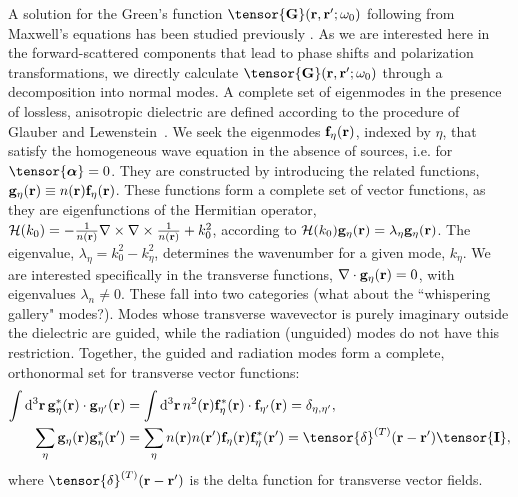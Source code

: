 \documentclass[preprint,aps,pra,onecolumn]{revtex4-1} %
\newcommand{\fidx}{\eta}
\newcommand{\unittens}{\tensor{\mathbf{I}}}
\newcommand{\eigenf}{\mbf{f}_\fidx}
\newcommand{\eigenfp}{\mbf{f}_{\fidx'}}
\newcommand{\eigeng}{\mbf{g}_\fidx}
\newcommand{\eigengp}{\mbf{g}_{\fidx'}}
\newcommand{\comment}[1]{{\color{Maroon} #1}}
\begin{document}
A solution for the Green's function $\tensor{\mathbf{G}}(\br ,\br' ; \omega_0)$ following from Maxwell's equations 
has been studied previously \cite{sakoda_optical_1996,sondergaard_general_2001,wubs_multiple-scattering_2004}.  As we are interested here in the forward-scattered components that lead to phase shifts and polarization transformations, we directly calculate $\tensor{\mathbf{G}}(\br ,\br' ; \omega_0)$ through a decomposition into normal modes.  A complete set of eigenmodes in the presence of lossless, anisotropic dielectric are defined according to the procedure of Glauber and Lewenstein~\cite{glauber_quantum_1991}.  We seek the eigenmodes $\eigenf(\mathbf{r})$, indexed by $\fidx$, that satisfy the homogeneous wave equation in the absence of sources, i.e.  for $\tensor{\boldsymbol{\alpha}} = 0$.  They are constructed by introducing the related functions, $\eigeng(\mbf{r}) \equiv n(\br) \eigenf(\mbf{r})$.  These functions form a complete set of vector functions, as they are eigenfunctions of the Hermitian operator, $\mathcal{H}(k_0) = -\frac{1}{n(\mathbf{r})} \nabla\times\nabla\times \frac{1}{n(\mathbf{r})} + k_0^2$, according to $\mathcal{H}(k_0)  \eigeng(\mbf{r}) = \lambda_\fidx \eigeng(\mbf{r})$. The eigenvalue, $\lambda_\fidx= k_0^2-k_\fidx^2$, determines the wavenumber for a given mode, $k_\fidx$.  We are interested specifically in the transverse functions, $\nabla \cdot \eigeng(\br) = 0$, with eigenvalues $\lambda_n \neq 0$.  These fall into two categories \comment{(what about the ``whispering gallery" modes?)}.  Modes whose transverse wavevector is purely imaginary outside the dielectric are guided, while the radiation (unguided) modes do not have this restriction. Together, the guided and radiation modes form a complete, orthonormal set for transverse vector functions:
	\begin{align}
	\int \mathrm{d}^3\br \, \eigeng^*(\mbf{r}) \cdot \eigengp(\mbf{r})  &= \int \mathrm{d}^3\br \, n^2(\br) \eigenf^* (\br)\cdot  \eigenfp(\br) =\delta_{\fidx, \fidx'},\label{Eq::Orthogonality}\\
	\sum_\fidx \eigeng(\br) \eigeng^*(\br') &= \sum_\fidx n(\br)n(\br') \eigenf(\br) \eigenf^*(\br') =\tensor{\delta}^{(T)}(\br-\br')  \unittens, \label{Eq::Completeness}
	\end{align}
where $\tensor{\delta}^{(T)}(\br-\br')$ is the delta function for transverse vector fields.  
\end{document}
